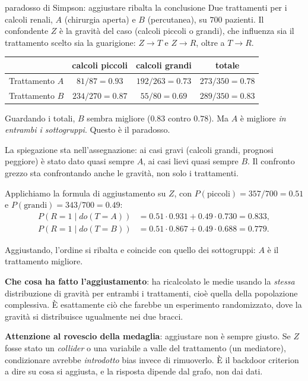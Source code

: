 \begin{esempiosvolto}{paradosso di Simpson: aggiustare ribalta la conclusione}
Due trattamenti per i calcoli renali, $A$ (chirurgia aperta) e $B$ (percutanea), su $700$ pazienti. Il confondente $Z$ è la gravità del caso (calcoli piccoli o grandi), che influenza sia il trattamento scelto sia la guarigione: $Z \to T$ e $Z \to R$, oltre a $T \to R$.

\begin{center}
\begin{tabular}{lccc}
\toprule
 & calcoli piccoli & calcoli grandi & \textbf{totale} \\
\midrule
Trattamento $A$ & $81/87 = 0.93$ & $192/263 = 0.73$ & $273/350 = \mathbf{0.78}$ \\
Trattamento $B$ & $234/270 = 0.87$ & $55/80 = 0.69$ & $289/350 = \mathbf{0.83}$ \\
\bottomrule
\end{tabular}
\end{center}

Guardando i totali, $B$ sembra migliore ($0.83$ contro $0.78$). Ma $A$ è migliore \emph{in entrambi i sottogruppi}. Questo è il paradosso.

La spiegazione sta nell'assegnazione: ai casi gravi (calcoli grandi, prognosi peggiore) è stato dato quasi sempre $A$, ai casi lievi quasi sempre $B$. Il confronto grezzo sta confrontando anche le gravità, non solo i trattamenti.

Applichiamo la formula di aggiustamento su $Z$, con $P(\text{piccoli}) = 357/700 = 0.51$ e $P(\text{grandi}) = 343/700 = 0.49$:
\begin{align*}
P(R{=}1 \mid do(T{=}A)) &= 0.51 \cdot 0.931 + 0.49 \cdot 0.730 = \mathbf{0.833},\\
P(R{=}1 \mid do(T{=}B)) &= 0.51 \cdot 0.867 + 0.49 \cdot 0.688 = \mathbf{0.779}.
\end{align*}

Aggiustando, l'ordine si ribalta e coincide con quello dei sottogruppi: $A$ è il trattamento migliore.

\textbf{Che cosa ha fatto l'aggiustamento}: ha ricalcolato le medie usando la \emph{stessa} distribuzione di gravità per entrambi i trattamenti, cioè quella della popolazione complessiva. È esattamente ciò che farebbe un esperimento randomizzato, dove la gravità si distribuisce ugualmente nei due bracci.

\textbf{Attenzione al rovescio della medaglia}: aggiustare non è sempre giusto. Se $Z$ fosse stato un \emph{collider} o una variabile a valle del trattamento (un mediatore), condizionare avrebbe \emph{introdotto} bias invece di rimuoverlo. È il backdoor criterion a dire su cosa si aggiusta, e la risposta dipende dal grafo, non dai dati.
\end{esempiosvolto}

